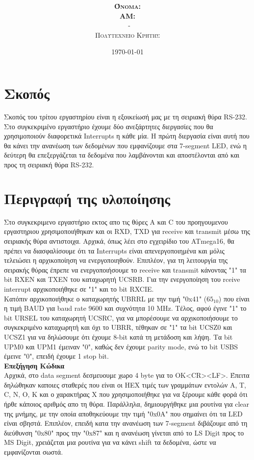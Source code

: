 \documentclass{article}
\title{\underline{\textbf{\assignmentNumber}}}
\author{\textsc{\textbf{Όνομα:}}  \studentName\\
		\textsc{\textbf{ΑΜ:}}  \studentNumber\\
		\course \ - \courseName\\ 
		\textsc{Πολυτεχνείο Κρήτης}
		}
\date{\today}
\begin{document}
	\maketitle

\section*{Σκοπός}
	Σκοπός του τρίτου εργαστηρίου είναι η εξοικείωσή μας με τη σειριακή θύρα RS-232. Στο συγκεκριμένο εργαστήριο έχουμε δύο ανεξάρτητες διεργασίες που θα χρησιμοποιούν διαφορετικά Interrupts η κάθε μία. Η πρώτη διεργασία είναι αυτή που θα κάνει την ανανέωση των δεδομένων που εμφανίζουμε στα 7-segment LED, ενώ η δεύτερη θα επεξεργάζεται τα δεδομένα που λαμβάνονται και αποστέλονται από και προς τη σειριακή θύρα RS-232. 

\section*{Περιγραφή της υλοποίησης}
	Στο συγκεκριμενο εργαστήριο εκτος απο τις θύρες Α και C του προηγουμενου εργαστηριου χρησιμοποιήθηκαν και οι RXD, TXD για receive και transmit μέσω της σειριακής θύρα αντιστοιχα. Aρχικά, όπως λέει στο εγχειρίδιο του ATmega16, θα πρέπει να διασφαλίσουμε ότι τα Interrupts είναι απενεργοποιημένα και μόλις τελειώσει η αρχικοποίηση να ενεργοποιηθούν. Επιπλέον, για τη λειτουργία της σειρακής θύρας έπρεπε να ενεργοποιήσουμε το receive και transmit κάνοντας "1" τα bit RXEN και TXEN του καταχωρητή UCSRB. Για την ενεργοποίηση του rceive interrupt αρχικοποιήθηκε σε "1" και το bit RXCIE. \\
	
	\noindent
	Kατόπιν αρχικοποιήθηκε ο καταχωρητής UBRRL με την τιμή "0x41" ($65_{10}$) που είναι η τιμή BAUD για baud rate 9600 και συχνότητα 10 MHz. Τέλος, αφού έγινε "1" το bit URSEL του καταχωρητή UCSRC, για να μπορέσουμε να αρχικοποιήσουμε το συγκεκριμένο καταχωρητή και όχι το UBRR, τέθηκαν σε "1" τα bit UCSZ0 και UCSZ1 για να δηλώσουμε ότι έχουμε 8-bit κατά τη μετάδοση και λήψη. Τα bit UPM0 και UPM1 έμειναν "0", καθώς δεν έχουμε parity mode, ενώ το bit USBS έμεινε "0", επειδή έχουμε 1 stop bit.\\

	\noindent
	\textbf{Επεξήγηση Κώδικα} \\
	\noindent
	Αρχικά, στο data segment δεσμευουμε χωρο 4 byte για το OK<CR><LF>. Έπειτα δηλώθηκαν καποιες σταθερές που είναι οι ΗΕΧ τιμές των γραμμάτων εντολών A, T, C, N, O, K και ο χαρακτήρας X που χρησιμοποιήθηκε για να ξέρουμε κάθε φορά ότι ήρθε κάποιος αριθμός απο τη θύρα. Παράλληλα, δημιουργήθηκε μια ρουτίνα για clear της μνήμης, με την οποία αποθηκεύουμε την τιμή "0x0A" που σημαίνει ότι τα LED είναι σβηστά. Eπιπλέον, επειδή κατα την ανανέωση των 7-segment διβάζουμε από τη διεύθυνση "0x80" προς την "0x87" και η ανανέωση γίνεται από το LS Digit προς το MS Digit, χρειάζεται μια ρουτίνα για να κάνει shift τα δεδομένα, ώστε να εμφανίζονται σωστά. \\
	
\end{document}
